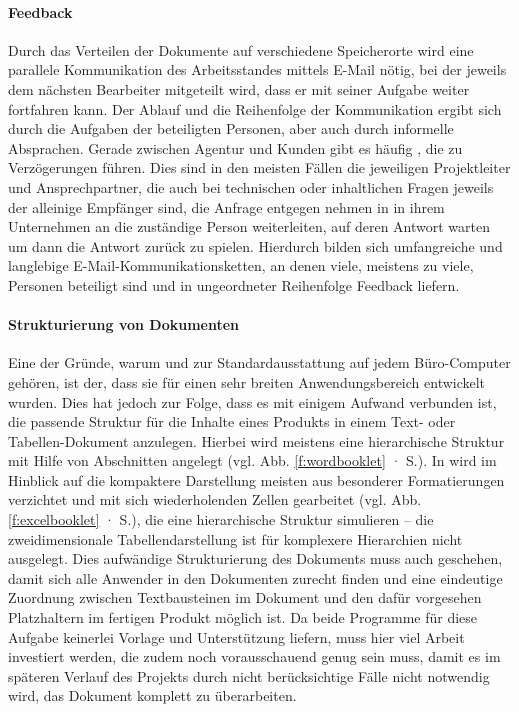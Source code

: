 \paragraph{Feedback} Durch das Verteilen der Dokumente auf verschiedene Speicherorte wird eine parallele Kommunikation des Arbeitsstandes mittels E-Mail nötig, bei der jeweils dem nächsten Bearbeiter mitgeteilt wird, dass er mit seiner Aufgabe weiter fortfahren kann. Der Ablauf und die Reihenfolge der Kommunikation ergibt sich durch die Aufgaben der beteiligten Personen, aber auch durch informelle Absprachen. Gerade zwischen Agentur und Kunden gibt es häufig , die zu Verzögerungen führen. Dies sind in den meisten Fällen die jeweiligen Projektleiter und Ansprechpartner, die auch bei technischen oder inhaltlichen Fragen jeweils der alleinige Empfänger sind, die Anfrage entgegen nehmen in in ihrem Unternehmen an die zuständige Person weiterleiten, auf deren Antwort warten um dann die Antwort zurück zu spielen. Hierdurch bilden sich umfangreiche und langlebige E-Mail-Kommunikationsketten, an denen viele, meistens zu viele, Personen beteiligt sind und in ungeordneter Reihenfolge Feedback liefern.

\paragraph{Strukturierung von Dokumenten} Eine der Gründe, warum  und  zur Standardausstattung auf jedem Büro-Computer gehören, ist der, dass sie für einen sehr breiten Anwendungsbereich entwickelt wurden. Dies hat jedoch zur Folge, dass es mit einigem Aufwand verbunden ist, die passende Struktur für die Inhalte eines Produkts in einem Text- oder Tabellen-Dokument anzulegen. Hierbei wird meistens eine hierarchische Struktur mit Hilfe von Abschnitten angelegt (vgl. Abb. \ref{f:wordbooklet} · S.\pageref{f:wordbooklet}). In  wird im Hinblick auf die kompaktere Darstellung meisten aus besonderer Formatierungen verzichtet und mit sich wiederholenden Zellen gearbeitet (vgl. Abb. \ref{f:excelbooklet} · S.\pageref{f:excelbooklet}), die eine hierarchische Struktur simulieren -- die zweidimensionale Tabellendarstellung ist für komplexere Hierarchien nicht ausgelegt. Dies aufwändige Strukturierung des Dokuments muss auch geschehen, damit sich alle Anwender in den Dokumenten zurecht finden und eine eindeutige Zuordnung zwischen Textbausteinen im Dokument und den dafür vorgesehen Platzhaltern im fertigen Produkt möglich ist. Da beide Programme für diese Aufgabe keinerlei Vorlage und Unterstützung liefern, muss hier viel Arbeit investiert werden, die zudem noch vorausschauend genug sein muss, damit es im späteren Verlauf des Projekts durch nicht berücksichtige Fälle nicht notwendig wird, das Dokument komplett zu überarbeiten.

